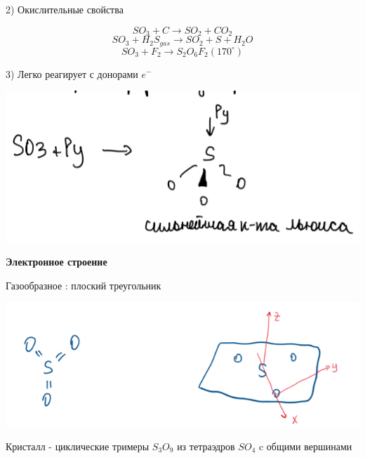 2) Окислительные свойства 

$$SO_3 + C \rightarrow SO_2 + CO_2$$
$$SO_3 + H_2S_{gas} \rightarrow SO_2 +S + H_2O$$
$$SO_3 + F_2 \rightarrow S_2O_6F_2(170^{\circ})$$

3) Легко реагирует с донорами $e^-$

\includegraphics{images/7v2.png}

\textbf{Электронное строение}

Газообразное : плоский треугольник

\includegraphics{images/7v3.png}

Кристалл - циклические тримеры $S_3O_9$ из тетраэдров $SO_4$ c общими вершинами

